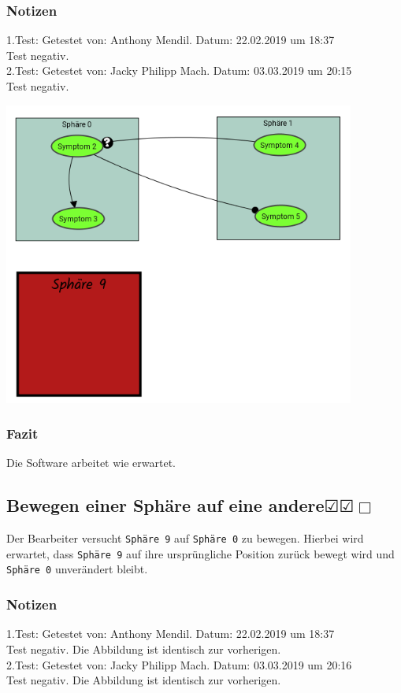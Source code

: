 \documentclass[enabledeprecatedfontcommands]{scrartcl}
\newcommand{\subsectiont}[2]{\subsection[#1]{#1{\normalsize\normalfont #2}}}
\newcommand{\leer}{$\Box$}
\newcommand{\ok}{$\CheckedBox$}
\begin{document}
\subsubsection{Notizen}
1.Test: Getestet von: Anthony Mendil. Datum: 22.02.2019 um 18:37 \\
Test negativ.\\
2.Test: Getestet von: Jacky Philipp Mach. Datum: 03.03.2019 um 20:15 \\
Test negativ. 
\begin{center}
\includegraphics[height=10cm]{2_18.PNG}
\end{center}
\subsubsection{Fazit}
Die Software arbeitet wie erwartet.

\subsectiont{Bewegen einer Sphäre auf eine andere}{\dotfill\ok\ok\leer}
Der Bearbeiter versucht \texttt{Sphäre 9} auf \texttt{Sphäre 0} zu bewegen. Hierbei wird erwartet, dass \texttt{Sphäre 9} auf ihre ursprüngliche Position zurück bewegt wird und \texttt{Sphäre 0} unverändert bleibt.   
\subsubsection{Notizen}
1.Test: Getestet von: Anthony Mendil. Datum: 22.02.2019 um 18:37 \\
Test negativ. Die Abbildung ist identisch zur vorherigen. \\
2.Test: Getestet von: Jacky Philipp Mach. Datum: 03.03.2019 um 20:16 \\
Test negativ. Die Abbildung ist identisch zur vorherigen.
\end{document}
